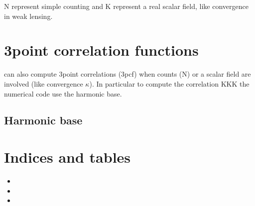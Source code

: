 \documentclass[letterpaper,10pt,english]{sphinxmanual}
\begin{document}
\sphinxAtStartPar
N represent simple counting and K represent a real scalar field, like convergence in weak lensing.

\sphinxstepscope


\chapter{3\sphinxhyphen{}point correlation functions}
\label{\detokenize{3pcf:point-correlation-functions}}\label{\detokenize{3pcf::doc}}
\sphinxAtStartPar
{} can also compute 3\sphinxhyphen{}point correlations (3pcf) when counts (N) or a scalar field are involved (like convergence \(\kappa\)). In particular to compute the correlation KKK the numerical code use the harmonic base.


\section{Harmonic base}
\label{\detokenize{3pcf:harmonic-base}}

\chapter{Indices and tables}
\label{\detokenize{index:indices-and-tables}}\begin{itemize}
\item {} 
\sphinxAtStartPar
{}

\item {} 
\sphinxAtStartPar
{}

\item {} 
\sphinxAtStartPar
{}

\end{itemize}



\renewcommand{\indexname}{Index}
\printindex
\end{document}
